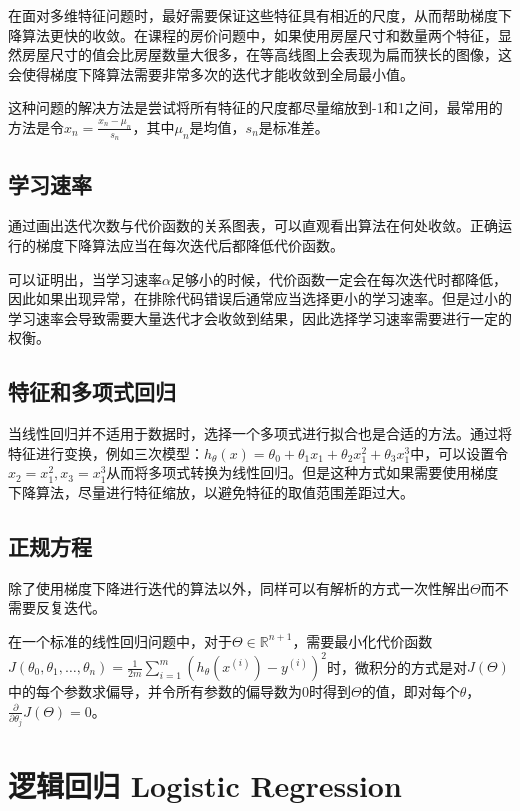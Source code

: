 \documentclass[12pt, a4paper]{article}
\begin{document}
在面对多维特征问题时，最好需要保证这些特征具有相近的尺度，从而帮助梯度下降算法更快的收敛。在课程的房价问题中，如果使用房屋尺寸和数量两个特征，显然房屋尺寸的值会比房屋数量大很多，在等高线图上会表现为扁而狭长的图像，这会使得梯度下降算法需要非常多次的迭代才能收敛到全局最小值。

这种问题的解决方法是尝试将所有特征的尺度都尽量缩放到-1和1之间，最常用的方法是令$x_n=\frac{x_n-\mu_n}{s_n}$，其中$\mu_n$是均值，$s_n$是标准差。

\subsection{学习速率}

通过画出迭代次数与代价函数的关系图表，可以直观看出算法在何处收敛。正确运行的梯度下降算法应当在每次迭代后都降低代价函数。

可以证明出，当学习速率$\alpha$足够小的时候，代价函数一定会在每次迭代时都降低，因此如果出现异常，在排除代码错误后通常应当选择更小的学习速率。但是过小的学习速率会导致需要大量迭代才会收敛到结果，因此选择学习速率需要进行一定的权衡。

\subsection{特征和多项式回归}

当线性回归并不适用于数据时，选择一个多项式进行拟合也是合适的方法。通过将特征进行变换，例如三次模型：$h_\theta(x)=\theta_0+\theta_1x_1+\theta_2x_1^2+\theta_3x_1^3$中，可以设置令$x_2=x_1^2,x_3=x_1^3$从而将多项式转换为线性回归。但是这种方式如果需要使用梯度下降算法，尽量进行特征缩放，以避免特征的取值范围差距过大。

\subsection{正规方程}

除了使用梯度下降进行迭代的算法以外，同样可以有解析的方式一次性解出$\Theta$而不需要反复迭代。

在一个标准的线性回归问题中，对于$\Theta\in\mathbb{R}^{n+1}$，需要最小化代价函数$J(\theta_0,\theta_1,\dots,\theta_n)=\frac{1}{2m}\sum_{i=1}^{m}(h_\theta(x^{(i)})-y^{(i)})^2$时，微积分的方式是对$J(\Theta)$中的每个参数求偏导，并令所有参数的偏导数为0时得到$\Theta$的值，即对每个$\theta$，$\frac{\partial}{\partial\theta_j}J(\Theta)=0$。

\section{逻辑回归 Logistic Regression}
\end{document}
